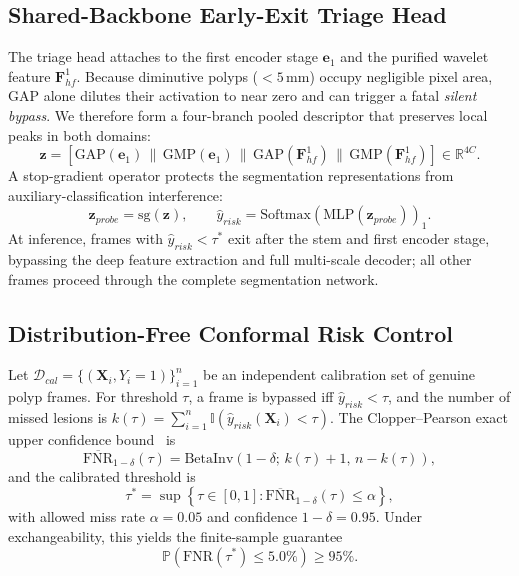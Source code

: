 \documentclass[journal]{IEEEtran}
\begin{document}
\subsection{Shared-Backbone Early-Exit Triage Head}
\label{ssec:triage}
The triage head attaches to the first encoder stage $\mathbf{e}_1$ and the purified wavelet feature $\mathbf{F}_{hf}^{1}$. Because diminutive polyps ($<5$\,mm) occupy negligible pixel area, GAP alone dilutes their activation to near zero and can trigger a fatal \emph{silent bypass}. We therefore form a four-branch pooled descriptor that preserves local peaks in both domains:
\begin{equation}
    \mathbf{z} = [\mathrm{GAP}(\mathbf{e}_1) \,\|\, \mathrm{GMP}(\mathbf{e}_1) \,\|\, \mathrm{GAP}(\mathbf{F}_{hf}^{1}) \,\|\, \mathrm{GMP}(\mathbf{F}_{hf}^{1})] \in \mathbb{R}^{4C}.
\end{equation}
A stop-gradient operator protects the segmentation representations from auxiliary-classification interference:
\begin{equation}
    \mathbf{z}_{probe} = \mathrm{sg}(\mathbf{z}), \qquad \hat{y}_{risk} = \mathrm{Softmax}(\mathrm{MLP}(\mathbf{z}_{probe}))_1 .
\end{equation}
At inference, frames with $\hat{y}_{risk} < \tau^{*}$ exit after the stem and first encoder stage, bypassing the deep feature extraction and full multi-scale decoder; all other frames proceed through the complete segmentation network.

\subsection{Distribution-Free Conformal Risk Control}
Let $\mathcal{D}_{cal} = \{(\mathbf{X}_i, Y_i{=}1)\}_{i=1}^{n}$ be an independent calibration set of genuine polyp frames. For threshold $\tau$, a frame is bypassed iff $\hat{y}_{risk} < \tau$, and the number of missed lesions is $k(\tau) = \sum_{i=1}^{n} \mathbb{I}(\hat{y}_{risk}(\mathbf{X}_i) < \tau)$. The Clopper--Pearson exact upper confidence bound~\cite{clopper1934use} is
\begin{equation}
    \overline{\mathrm{FNR}}_{1-\delta}(\tau) = \mathrm{BetaInv}\!\left(1-\delta;\, k(\tau)+1,\, n-k(\tau)\right),
\end{equation}
and the calibrated threshold is
\begin{equation}
    \tau^{*} = \sup \left\{ \tau \in [0,1] : \overline{\mathrm{FNR}}_{1-\delta}(\tau) \le \alpha \right\},
\end{equation}
with allowed miss rate $\alpha = 0.05$ and confidence $1-\delta = 0.95$. Under exchangeability, this yields the finite-sample guarantee
\begin{equation}
    \mathbb{P}\!\left( \mathrm{FNR}(\tau^{*}) \le 5.0\% \right) \ge 95\%.
\end{equation}
\end{document}
